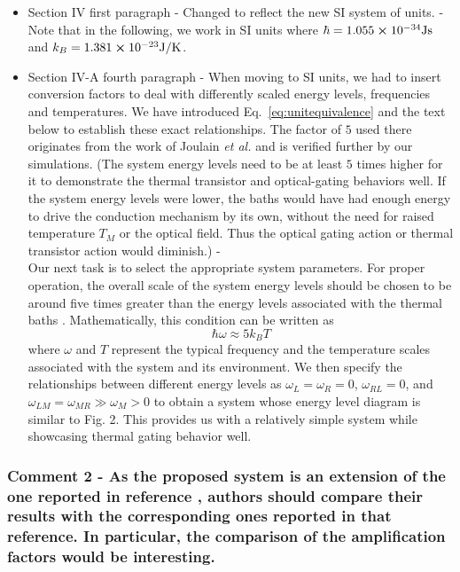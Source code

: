 \documentclass{article}
\begin{document}
\begin{itemize}
    \item Section IV first paragraph -
        Changed to reflect the new SI system of units. - \\
            {\color{Maroon} Note that in the following, we work in SI units where $\hbar=1.055\cross10^{-34} \text{Js}$ and $k_B=1.381\cross10^{-23} \text{J/K}$.}
    \item Section IV-A fourth paragraph -
        When moving to SI units, we had to insert conversion factors to deal with differently scaled energy levels, frequencies and temperatures. We have introduced Eq.~\ref{eq:unitequivalence} and the text below to establish these exact relationships. The factor of $5$ used there originates from the work of Joulain \textit{et al.} \cite{joulain2016quantum} and is verified further by our simulations. (The system energy levels need to be at least $5$ times higher for it to demonstrate the thermal transistor and optical-gating behaviors well. If the system energy levels were lower, the baths would have had enough energy to drive the conduction mechanism by its own, without the need for raised temperature $T_M$ or the optical field. Thus the optical gating action or thermal transistor action would diminish.) - \\
            {\color{Maroon} Our next task is to select the appropriate system parameters. For proper operation, the overall scale of the system energy levels should be chosen to be around five times greater than the energy levels associated with the thermal baths \cite{joulain2016quantum}. Mathematically, this condition can be written as
            \setcounter{equation}{24}
            \begin{equation}
                \hbar \omega \approx 5 k_B T
                \label{eq:unitequivalence}
            \end{equation}
            where $\omega$ and $T$ represent the typical frequency and the temperature scales associated with the system and its environment. We then specify the relationships between different energy levels as $\omega_L=\omega_R=0$, $\omega_{RL}=0$, and $\omega_{LM}=\omega_{MR}\gg\omega_M>0$ to obtain a system whose energy level diagram is similar to Fig. 2. This provides us with a relatively simple system while showcasing thermal gating behavior well.}
\end{itemize}


\subsubsection*{Comment 2 -
\color{RoyalBlue} As the proposed system is an extension of the one reported in
reference \cite{joulain2016quantum}, authors should compare their results with the
corresponding ones reported in that reference. In particular, the
comparison of the amplification factors would be interesting.}
\end{document}
